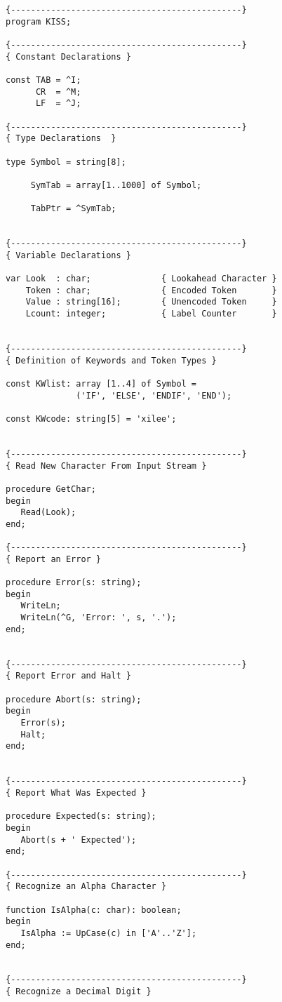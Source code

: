 \begin{verbatim}
{----------------------------------------------}
program KISS;

{----------------------------------------------}
{ Constant Declarations }

const TAB = ^I;
      CR  = ^M;
      LF  = ^J;

{----------------------------------------------}
{ Type Declarations  }

type Symbol = string[8];

     SymTab = array[1..1000] of Symbol;

     TabPtr = ^SymTab;


{----------------------------------------------}
{ Variable Declarations }

var Look  : char;              { Lookahead Character }
    Token : char;              { Encoded Token       }
    Value : string[16];        { Unencoded Token     }
    Lcount: integer;           { Label Counter       }


{----------------------------------------------}
{ Definition of Keywords and Token Types }

const KWlist: array [1..4] of Symbol =
              ('IF', 'ELSE', 'ENDIF', 'END');

const KWcode: string[5] = 'xilee';


{----------------------------------------------}
{ Read New Character From Input Stream }

procedure GetChar;
begin
   Read(Look);
end;

{----------------------------------------------}
{ Report an Error }

procedure Error(s: string);
begin
   WriteLn;
   WriteLn(^G, 'Error: ', s, '.');
end;


{----------------------------------------------}
{ Report Error and Halt }

procedure Abort(s: string);
begin
   Error(s);
   Halt;
end;


{----------------------------------------------}
{ Report What Was Expected }

procedure Expected(s: string);
begin
   Abort(s + ' Expected');
end;

{----------------------------------------------}
{ Recognize an Alpha Character }

function IsAlpha(c: char): boolean;
begin
   IsAlpha := UpCase(c) in ['A'..'Z'];
end;


{----------------------------------------------}
{ Recognize a Decimal Digit }


\end{verbatim}
